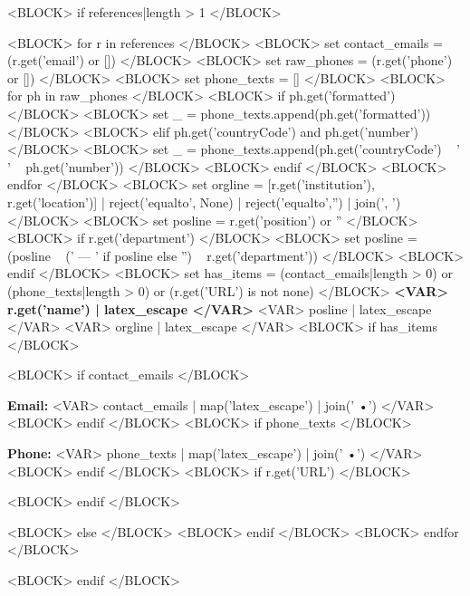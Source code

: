 <BLOCK> if references|length > 1 </BLOCK>


\begin{cventries}
<BLOCK> for r in references </BLOCK>
  <BLOCK> set contact_emails = (r.get('email') or []) </BLOCK>
  <BLOCK> set raw_phones = (r.get('phone') or []) </BLOCK>
  <BLOCK> set phone_texts = [] </BLOCK>
  <BLOCK> for ph in raw_phones </BLOCK>
    <BLOCK> if ph.get('formatted') </BLOCK>
      <BLOCK> set _ = phone_texts.append(ph.get('formatted')) </BLOCK>
    <BLOCK> elif ph.get('countryCode') and ph.get('number') </BLOCK>
      <BLOCK> set _ = phone_texts.append(ph.get('countryCode') ~ ' ' ~ ph.get('number')) </BLOCK>
    <BLOCK> endif </BLOCK>
  <BLOCK> endfor </BLOCK>
  <BLOCK> set orgline = [r.get('institution'), r.get('location')]
                         | reject('equalto', None)
                         | reject('equalto','')
                         | join(', ') </BLOCK>
  <BLOCK> set posline = r.get('position') or '' </BLOCK>
  <BLOCK> if r.get('department') </BLOCK>
    <BLOCK> set posline = (posline ~ (' — ' if posline else '') ~ r.get('department')) </BLOCK>
  <BLOCK> endif </BLOCK>
  <BLOCK> set has_items = (contact_emails|length > 0) or (phone_texts|length > 0) or (r.get('URL') is not none) </BLOCK>
  \cventry
    {\textbf{<VAR> r.get('name') | latex_escape </VAR>}} %
    {<VAR> posline | latex_escape </VAR>}                 %
    {<VAR> orgline | latex_escape </VAR>}                 %
    {}                                                    %
    <BLOCK> if has_items </BLOCK>
    {%
      \begin{cvitems}
        <BLOCK> if contact_emails </BLOCK>
          \item {\textbf{Email:} <VAR> contact_emails | map('latex_escape') | join(' \enskip•\enskip ') </VAR>}
        <BLOCK> endif </BLOCK>
        <BLOCK> if phone_texts </BLOCK>
          \item {\textbf{Phone:} <VAR> phone_texts | map('latex_escape') | join(' \enskip•\enskip ') </VAR>}
        <BLOCK> endif </BLOCK>
        <BLOCK> if r.get('URL') </BLOCK>
          \item {\href{<VAR> r.get('URL') </VAR>}{\honorlocationstyle{[LETTER]}}}
        <BLOCK> endif </BLOCK>
      \end{cvitems}
    }
    <BLOCK> else </BLOCK>
    {} %
    <BLOCK> endif </BLOCK>
<BLOCK> endfor </BLOCK>
\end{cventries}
<BLOCK> endif </BLOCK>
